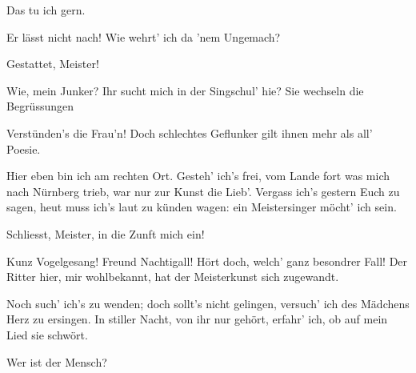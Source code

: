 \begin{drama}
\Pognerspeaks
Das tu ich gern.

\Beckmesserspeaks
{}

Er lässt nicht nach!
Wie wehrt' ich da 'nem Ungemach?

\Waltherspeaks


Gestattet, Meister!

\Pognerspeaks

Wie, mein Junker?
Ihr sucht mich in der Singschul' hie?
Sie wechseln die Begrüssungen

\Beckmesserspeaks
{}

Verstünden's die Frau'n! Doch schlechtes Geflunker
gilt ihnen mehr als all' Poesie.



\Waltherspeaks

Hier eben bin ich am rechten Ort.
Gesteh' ich's frei, vom Lande fort
was mich nach Nürnberg trieb,
war nur zur Kunst die Lieb'.
Vergass ich's gestern Euch zu sagen,
heut muss ich's laut zu künden wagen:
ein Meistersinger möcht' ich sein.


Schliesst, Meister, in die Zunft mich ein!



\Pognerspeaks
{}

Kunz Vogelgesang! Freund Nachtigall!
Hört doch, welch' ganz besondrer Fall!
Der Ritter hier, mir wohlbekannt,
hat der Meisterkunst sich zugewandt.


\Beckmesserspeaks


Noch such' ich's zu wenden;
doch sollt's nicht gelingen,
versuch' ich des Mädchens Herz zu ersingen.
In stiller Nacht, von ihr nur gehört,
erfahr' ich, ob auf mein Lied sie schwört.


Wer ist der Mensch?

\Pognerspeaks



\end{drama}
